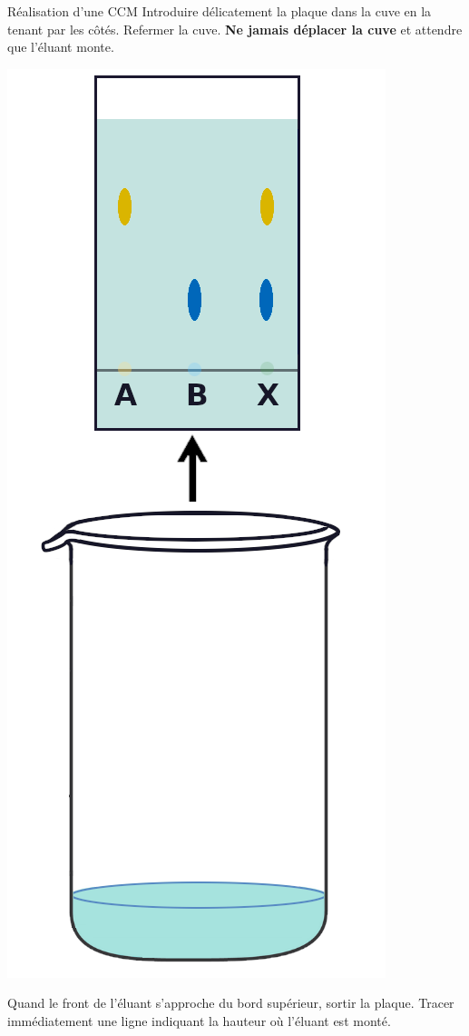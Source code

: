 \begin{doc}{Réalisation d'une CCM}
{    \vspace*{-12pt}
    Introduire délicatement la plaque dans la cuve en la tenant par les côtés.
    Refermer la cuve.
    \textbf{Ne jamais déplacer la cuve} et attendre que l'éluant monte.
  }{
    \begin{center}
      \includegraphics[height=0.25\textheight]{images/CCM/CCM_etapes_retrait.png}
    \end{center}
    
    \vspace*{-12pt}
    Quand le front de l'éluant s'approche du bord supérieur, sortir la plaque.
    Tracer immédiatement une ligne indiquant la hauteur où l'éluant est monté.
  }
\end{doc}


